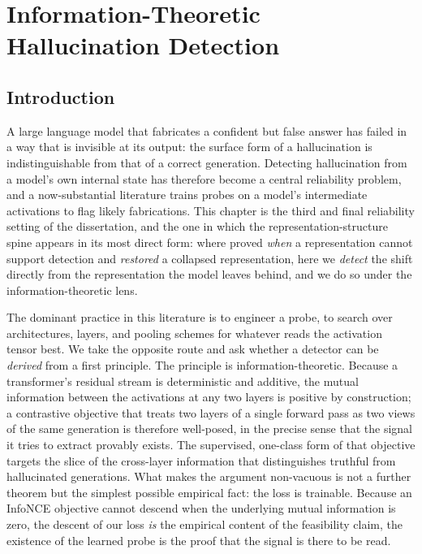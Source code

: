 \chapter{Information-Theoretic Hallucination Detection}
\label{ch:hallucination-detection}

\section{Introduction}
\label{sec:hd:intro}

A large language model that fabricates a confident but false answer has failed in
a way that is invisible at its output: the surface form of a hallucination is
indistinguishable from that of a correct generation. Detecting hallucination from
a model's own internal state has therefore become a central reliability problem,
and a now-substantial literature trains probes on a model's intermediate
activations to flag likely fabrications. This chapter is the third and final
reliability setting of the dissertation, and the one in which the
representation-structure spine appears in its most direct form: where
 proved \emph{when} a representation cannot support
detection and  \emph{restored} a collapsed
representation, here we \emph{detect} the shift directly from the representation
the model leaves behind, and we do so under the information-theoretic lens.

The dominant practice in this literature is to engineer a probe, to search over
architectures, layers, and pooling schemes for whatever reads the activation
tensor best. We take the opposite route and ask whether a detector can be
\emph{derived} from a first principle. The principle is information-theoretic.
Because a transformer's residual stream is deterministic and additive, the mutual
information between the activations at any two layers is positive by construction;
a contrastive objective that treats two layers of a single forward pass as two
views of the same generation is therefore well-posed, in the precise sense that
the signal it tries to extract provably exists. The supervised, one-class form of
that objective targets the slice of the cross-layer information that distinguishes
truthful from hallucinated generations. What makes the argument non-vacuous is not
a further theorem but the simplest possible empirical fact: the loss is trainable.
Because an InfoNCE objective cannot descend when the underlying mutual information
is zero, the descent of our loss \emph{is} the empirical content of the
feasibility claim, the existence of the learned probe is the proof that the
signal is there to be read.


